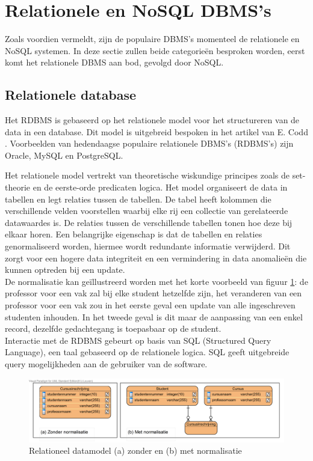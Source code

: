 \section{Relationele en NoSQL DBMS's} 
Zoals voordien vermeldt, zijn de populaire DBMS's momenteel de relationele en NoSQL systemen. In deze sectie zullen beide categorieën besproken worden, eerst komt het relationele DBMS aan bod, gevolgd door NoSQL. 

\subsection{Relationele database}
Het RDBMS is gebaseerd op het relationele model voor het structureren van de data in een database. Dit model is uitgebreid bespoken in het artikel van E. Codd \cite{codd1970relational}. Voorbeelden van hedendaagse populaire relationele DBMS's (RDBMS's) zijn Oracle, MySQL en PostgreSQL. 

Het relationele model vertrekt van theoretische wiskundige principes zoals de set-theorie en de eerste-orde predicaten logica. Het model organiseert de data in tabellen en legt relaties tussen de tabellen. De tabel heeft kolommen die verschillende velden voorstellen waarbij elke rij een collectie van gerelateerde datawaardes is. De relaties tussen de verschillende tabellen tonen hoe deze bij elkaar horen. Een belangrijke eigenschap is dat de tabellen en relaties genormaliseerd worden, hiermee wordt redundante informatie verwijderd. Dit zorgt voor een hogere data integriteit en een vermindering in data anomalieën die kunnen optreden bij een update.\cite{Elmasri:2010:FDS:1855347} \\
De normalisatie kan geïllustreerd worden met het korte voorbeeld van figuur \ref{fig:Relationeel-Model-Normalisatie}: de professor voor een vak zal bij elke student hetzelfde zijn, het veranderen van een professor voor een vak zou in het eerste geval een update van alle ingeschreven studenten inhouden. In het tweede geval is dit maar de aanpassing van een enkel record, dezelfde gedachtegang is toepasbaar op de student. \\
Interactie met de RDBMS gebeurt op basis van SQL (Structured Query Language), een taal gebaseerd op de relationele logica. SQL geeft uitgebreide query mogelijkheden aan de gebruiker van de software.   
\begin{figure}[ht!]
\centering
\includegraphics[width=\linewidth]{img/Relationeel-Model-Normalisatie.png}
\caption[Relationeel datamodel (a) zonder en (b) met normalisatie]{Relationeel datamodel (a) zonder en (b) met normalisatie}
\label{fig:Relationeel-Model-Normalisatie}
\end{figure}

